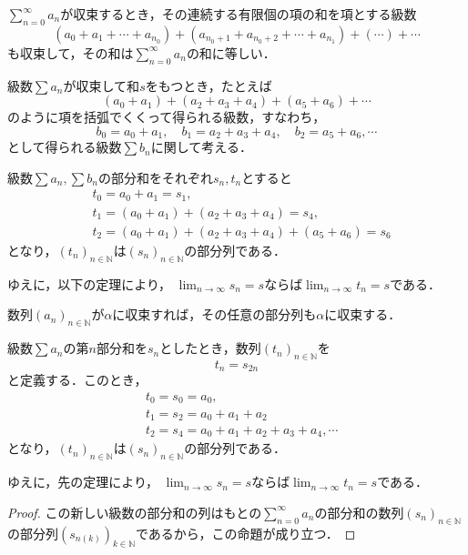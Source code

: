 \begin{prop}{}{}
  $\sum_{n=0}^{\infty} a_n$が収束するとき，その連続する有限個の項の和を項とする級数
  \[
    (a_0+a_1+\cdots+a_{n_0})+(a_{n_0 +1}+a_{n_0 +2}+\cdots+a_{n_1})+(\cdots)+\cdots
  \]
  も収束して，その和は$\sum_{n=0}^{\infty} a_n$の和に等しい．
\end{prop}

\begin{example}{}{}
  級数$ \sum a_n$が収束して和$s$をもつとき，たとえば
  \[
    (a_0+a_1) + (a_2+a_3+a_4)+(a_5+a_6)+ \cdots
  \]
  のように項を括弧でくくって得られる級数，すなわち，
  \[
    b_0 = a_0 + a_1 , \quad b_1 =a_2 + a_3 + a_4 ,\quad b_2 =a_5 + a_6 , \cdots
  \]
  として得られる級数$\sum b_n$に関して考える．

  級数$\sum a_n,\sum b_n$の部分和をそれぞれ$s_n,t_n$とすると
  \begin{align*}
    & t_0 = a_0 + a_1=s_1  , \\
    & t_1 = (a_0 + a_1) + (a_2 + a_3 + a_4)=s_4 ,\\
    & t_2 = (a_0+a_1)+ (a_2 + a_3+a_4)+(a_5+a_6) = s_6
  \end{align*}
  となり，$(t_n)_{n \in \mathbb{N}}$は$(s_n)_{n \in \mathbb{N}}$の部分列である．

  ゆえに，以下の定理により，
  $\lim_{n \to \infty} s_n=s$ならば$\lim_{n \to \infty} t_n =s$である．
\end{example}

\begin{theorem}{}{}
  数列$(a_n)_{n \in \mathbb{N}}$が$\alpha$に収束すれば，その任意の部分列も$\alpha$に収束する．
\end{theorem}

\begin{example}{}{}
  級数$\sum a_n$の第$n$部分和を$s_n$としたとき，数列$(t_n)_{n \in \mathbb{N}}$を
  \[
    t_n=s_{2n}
  \]
  と定義する．このとき，
  \begin{align*}
    & t_0 = s_0=a_0 , \\
    & t_1 = s_2 = a_0 + a_1 + a_2 \\
    & t_2 = s_4 = a_0 + a_1 + a_2 + a_3 + a_4 , \cdots
  \end{align*}
  となり，$(t_n)_{n \in \mathbb{N}}$は$(s_n)_{n \in \mathbb{N}}$の部分列である．

  ゆえに，先の定理により，
  $\lim_{n \to \infty} s_n=s$ならば$\lim_{n \to \infty} t_n =s$である．
\end{example}

\begin{leftbar}
\begin{proof}
  この新しい級数の部分和の列はもとの$\sum_{n=0}^{\infty} a_n$の部分和の数列$(s_n)_{n \in \mathbb{N}}$の部分列$(s_{n(k)})_{k \in \mathbb{N}}$であるから，この命題が成り立つ．
\end{proof}
\end{leftbar}

